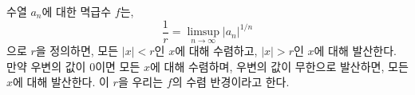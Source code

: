 \begin{theorem}
\label{thm:radconv}
    수열 $a_n$에 대한 멱급수 $f$는,
    \begin{equation*}
        \frac{1}{r} = \limsup_{n \to \infty} |a_n|^{1/n}
    \end{equation*}
    으로 $r$을 정의하면, 모든 $|x| < r$인 $x$에 대해 수렴하고, $|x| > r$인 $x$에 대해 발산한다.
    만약 우변의 값이 $0$이면 모든 $x$에 대해 수렴하며, 우변의 값이 무한으로 발산하면, 모든 $x$에 대해 발산한다.
    이 $r$을 우리는 $f$의 수렴 반경이라고 한다.
\end{theorem}







